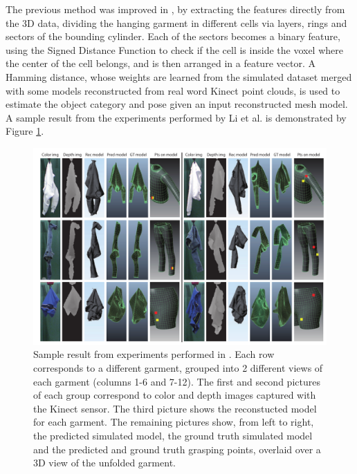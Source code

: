 The previous method was improved in \cite{Li2014IROS}, by extracting the features directly from the 3D data, dividing the hanging garment in different cells via layers, rings and sectors of the bounding cylinder. Each of the sectors becomes a binary feature, using the Signed Distance Function to check if the cell is inside the voxel where the center of the cell belongs, and is then arranged in a feature vector. A Hamming distance, whose weights are learned from the simulated dataset merged with some models reconstructed from real word Kinect point clouds, is used to estimate the object category and pose given an input reconstructed mesh model. A sample result from the experiments performed by Li et al. is demonstrated by Figure \ref{fig:SOTA_Li_2014}. 

\begin{figure}[thpb]
    \centering
    \includegraphics[width=\textwidth]{figures/SOTA_Li_2014-2.png}
    \caption[Sample result from experiments performed by Li et al.]
    {Sample result from experiments performed in \cite{Li2014IROS}. Each row corresponds to a different garment, grouped into 2 different views of each garment (columns 1-6 and 7-12). The first and second pictures of each group correspond to color and depth images captured with the Kinect sensor. The third picture shows the reconstucted model for each garment. The remaining pictures show, from left to right, the predicted simulated model, the ground truth simulated model and the predicted and ground truth grasping points, overlaid over a 3D view of the unfolded garment.}
    \label{fig:SOTA_Li_2014}
\end{figure}

